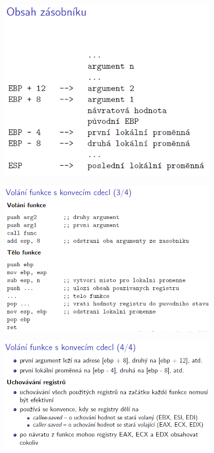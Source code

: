 \documentclass[10pt,a4paper]{article}
\begin{document}
\begin{figure} [h]
	\includegraphics[scale=0.65]{img/prvni_odstavec/otazka5/podprogramy5.png}	
\end{figure}

\begin{figure} [h]
	\includegraphics[scale=0.65]{img/prvni_odstavec/otazka5/podprogramy6.png}	
\end{figure}

\clearpage
\begin{figure} [h]
	\includegraphics[scale=0.65]{img/prvni_odstavec/otazka5/podprogramy7.png}	
\end{figure}
\end{document}
